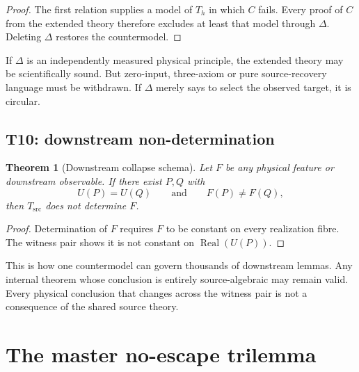 \documentclass[10pt,a4paper]{article}
\newtheorem{theorem}{Theorem}[section]
\theoremstyle{definition}
\theoremstyle{remark}
\newcommand{\Tsrc}{T_{\mathrm{src}}}
\newcommand{\Real}{\operatorname{Real}}
\begin{document}
\begin{proof}
The first relation supplies a model of \(T_h\) in which \(C\) fails.  Every
proof of \(C\) from the extended theory therefore excludes at least that model
through \(\Delta\).  Deleting \(\Delta\) restores the countermodel.
\end{proof}

If \(\Delta\) is an independently measured physical principle, the extended
theory may be scientifically sound.  But zero-input, three-axiom or pure
source-recovery language must be withdrawn.  If \(\Delta\) merely says to
select the observed target, it is circular.

\subsection{T10: downstream non-determination}

\begin{theorem}[Downstream collapse schema]
\label{thm:downstream}
Let \(F\) be any physical feature or downstream observable.  If there exist
\(P,Q\) with
\[
U(P)=U(Q)
\qquad\text{and}\qquad
F(P)\neq F(Q),
\]
then \(\Tsrc\) does not determine \(F\).
\end{theorem}

\begin{proof}
Determination of \(F\) requires \(F\) to be constant on every realization
fibre.  The witness pair shows it is not constant on \(\Real(U(P))\).
\end{proof}

This is how one countermodel can govern thousands of downstream lemmas.  Any
internal theorem whose conclusion is entirely source-algebraic may remain
valid.  Every physical conclusion that changes across the witness pair is not
a consequence of the shared source theory.

\section{The master no-escape trilemma}
\end{document}
